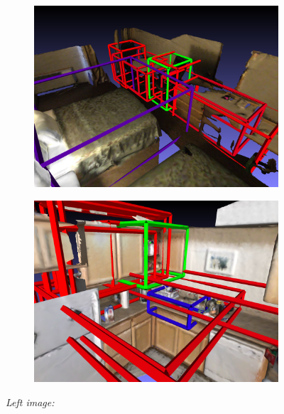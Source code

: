 \documentclass[10pt,twocolumn,letterpaper]{article}
\begin{document}
\begin{figure}[b]
	\centering
	\begin{subfigure}[c]{.49\linewidth}
		\centering
		\includegraphics[width=\linewidth]{figures/gt_scene0221_00_3_0_att_02.png}
		\label{fig:example_1}
	\end{subfigure}
	\begin{subfigure}[c]{.49\linewidth}
		\centering
		\includegraphics[width=\textwidth]{figures/gt_scene0164_00_2_0_att_06.png}
		\label{fig:example_2}
	\end{subfigure}
	\vspace{-1.\baselineskip}
	\begin{flushleft}
		{\scriptsize 
			\textit{Left image:}\\
}
\end{flushleft}
\end{figure}
\end{document}
